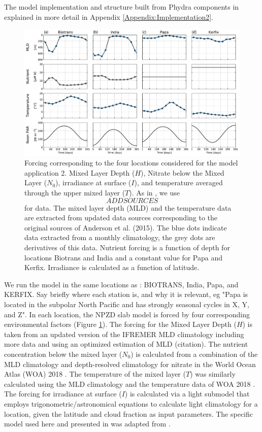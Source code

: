 \documentclass[journal abbreviation, manuscript]{copernicus}
\begin{document}
The model implementation and structure built from Phydra components in explained in more detail in Appendix \ref{Appendix:Implementation2}.
\begin{figure}[t]
\includegraphics[width=15cm]{Figures/firstdraft_plots/02_EMPOWER_forcing.pdf}
\caption{Forcing corresponding to the four locations considered for the model application 2. Mixed Layer Depth ($H$), Nitrate below the Mixed Layer ($N_0$), irradiance at surface ($I$), and temperature averaged through the upper mixed layer ($T$). As in \citet{Anderson2015c}, we use $$ADD SOURCES$$ for data. The mixed layer depth (MLD) and the temperature data are extracted from updated data sources corresponding to the original sources of Anderson et al. (2015). The blue dots indicate data extracted from a monthly climatology, the grey dots are derivatives of this data. Nutrient forcing is a function of depth for locations Biotrans and India and a constant value for Papa and Kerfix. Irradiance is calculated as a function of latitude.}
\label{Figure:EMPOWERforcing}
\end{figure}

We run the model in the same locations as \citet{Anderson2015c}: BIOTRANS, India, Papa, and KERFIX. Say briefly where each station is, and why it is relevant, eg "Papa is located in the subpolar North Pacific and has strongly seasonal cycles in X, Y, and Z". In each location, the NPZD slab model is forced by four corresponding environmental factors (Figure \ref{Figure:EMPOWERforcing}). 
The forcing for the Mixed Layer Depth ($H$) is taken from an updated version of the IFREMER MLD climatology  \citep{DeBoyerMontegut2004} including more data and using an optimized estimation of MLD (citation).
The nutrient concentration below the mixed layer ($N_0$) is calculated from a combination of the MLD climatology and depth-resolved climatology for nitrate in the World Ocean Atlas (WOA) 2018 \citep{Garcia2019WORLDSilicate}. The temperature of the mixed layer ($T$) was similarly calculated using the MLD climatology and the temperature data of WOA 2018 \citep{Locarnini2019WorldTemperature}.
The forcing for irradiance at surface ($I$) is calculated via a light submodel that employs trigonometric/astronomical equations to calculate light climatology for a location, given the latitude and cloud fraction as input parameters. The specific model used here and presented in \citet{Anderson2015c} was adapted from \citet{Shine1984ParametrizationAlbedo}.
\end{document}
